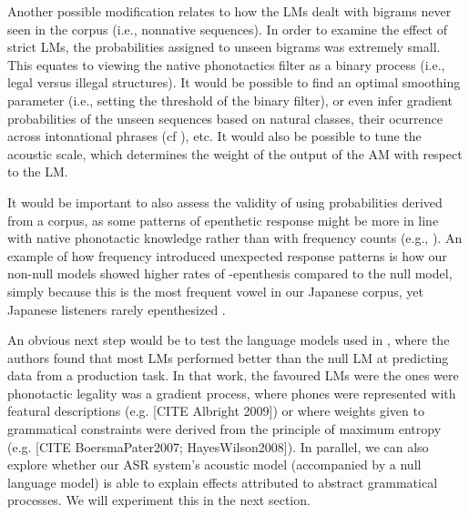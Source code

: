 {Another possible modification relates to how the LMs dealt with bigrams never seen in the corpus (i.e., nonnative sequences). In order to examine the effect of strict LMs, the probabilities assigned to unseen bigrams was extremely small. This equates to viewing the native phonotactics filter as a binary process (i.e., legal versus illegal structures). It would be possible to find an optimal smoothing parameter (i.e., setting the threshold of the binary filter), or even infer gradient probabilities of the unseen sequences based on natural classes, their ocurrence across intonational phrases (cf \cite{durvasula2016}), etc. It would also be possible to tune the acoustic scale, which determines the weight of the output of the AM with respect to the LM.

It would be important to also assess the validity of using probabilities derived from a corpus, as some patterns of epenthetic response might be more in line with native phonotactic knowledge rather than with frequency counts (e.g., \cite{kabak2007}). An example of how frequency introduced unexpected response patterns is how our non-null models showed higher rates of -epenthesis compared to the null model, simply because this is the most frequent vowel in our Japanese corpus, yet Japanese listeners rarely epenthesized \textipa{[a]}.  

An obvious next step would be to test the language models used in \cite{wilson2014}, where the authors found that most LMs performed better than the null LM at predicting data from a production task. In that work, the favoured LMs were the ones were phonotactic legality was a gradient process, where phones were represented with featural descriptions (e.g. {\color{red}[CITE Albright 2009]}) or where weights given to grammatical constraints were derived from the principle of maximum entropy (e.g. {\color{red}[CITE BoersmaPater2007; HayesWilson2008]}). In parallel, we can also explore whether our ASR system's acoustic model (accompanied by a null language model) is able to explain effects attributed to abstract grammatical processes. We will experiment this in the next section. 

}
